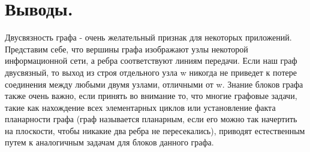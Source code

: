 \documentclass[12pt,a4paper]{scrartcl}
\begin{document}
\section{Выводы.}

 Двусвязность графа - очень желательный признак для некоторых приложений. Представим себе, что вершины графа изображают узлы некоторой информационной сети, а ребра соответствуют линиям передачи. Если наш граф двусвязный, то выход из строя отдельного узла w никогда не приведет к потере соединения между любыми двумя узлами, отличными от w. Знание блоков графа также очень важно, если принять во внимание то, что многие графовые задачи, такие как нахождение всех элементарных циклов или установление факта планарности графа (граф называется планарным, если его можно так начертить на плоскости, чтобы никакие два ребра не пересекались), приводят естественным путем к аналогичным задачам для блоков данного графа.
\end{document}
